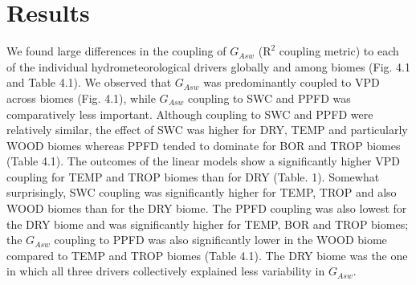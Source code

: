 \documentclass[11pt,twoside]{reedthesis}
\begin{document}
\section{Results}\label{results}

We found large differences in the coupling of \(G_{Asw}\)
(\(\text{R}^2\) coupling metric) to each of the individual
hydrometeorological drivers globally and among biomes (Fig. 4.1 and
Table 4.1). We observed that \(G_{Asw}\) was predominantly coupled to
VPD across biomes (Fig. 4.1), while \(G_{Asw}\) coupling to SWC and PPFD
was comparatively less important. Although coupling to SWC and PPFD were
relatively similar, the effect of SWC was higher for DRY, TEMP and
particularly WOOD biomes whereas PPFD tended to dominate for BOR and
TROP biomes (Table 4.1). The outcomes of the linear models show a
significantly higher VPD coupling for TEMP and TROP biomes than for DRY
(Table. 1). Somewhat surprisingly, SWC coupling was significantly higher
for TEMP, TROP and also WOOD biomes than for the DRY biome. The PPFD
coupling was also lowest for the DRY biome and was significantly higher
for TEMP, BOR and TROP biomes; the \(G_{Asw}\) coupling to PPFD was also
significantly lower in the WOOD biome compared to TEMP and TROP biomes
(Table 4.1). The DRY biome was the one in which all three drivers
collectively explained less variability in \(G_{Asw}\).\par
\end{document}
